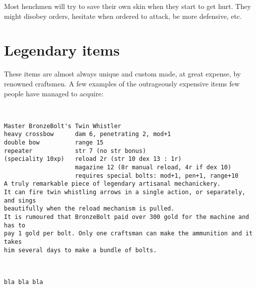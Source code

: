 Most henchmen will try to save their own skin when they start to get hurt. They might disobey orders, hesitate when ordered to attack, be more defensive, etc.












\section*{Legendary items}


These items are almost always unique and custom made, at great expense, by renowned craftsmen. A few examples of the outrageously expensive items few people have managed to acquire:

\

\small \begin{samepage} \begin{verbatim}
Master BronzeBolt's Twin Whistler
heavy crossbow      dam 6, penetrating 2, mod+1
double bow          range 15
repeater            str 7 (no str bonus)
(speciality 10xp)   reload 2r (str 10 dex 13 : 1r)
                    magazine 12 (8r manual reload, 4r if dex 10)
                    requires special bolts: mod+1, pen+1, range+10
A truly remarkable piece of legendary artisanal mechanickery.
It can fire twin whistling arrows in a single action, or separately, and sings
beautifully when the reload mechanism is pulled.
It is rumoured that BronzeBolt paid over 300 gold for the machine and has to
pay 1 gold per bolt. Only one craftsman can make the ammunition and it takes
him several days to make a bundle of bolts.
\end{verbatim} \end{samepage} \normalsize

\

\small \begin{samepage} \begin{verbatim}
bla bla bla
\end{verbatim} \end{samepage} \normalsize




